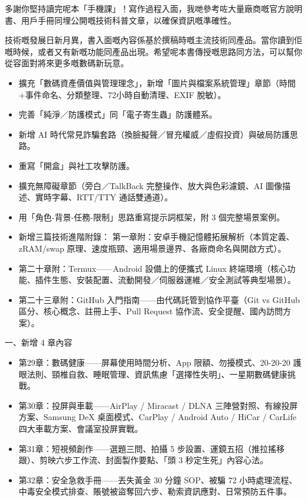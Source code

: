 
多謝你堅持讀完呢本「手機課」！寫作過程入面，我哋參考咗大量廠商嘅官方說明書、用戶手冊同埋公開嘅技術科普文章，以確保資訊嘅準確性。

技術嘅發展日新月異，書入面嘅內容係基於撰稿時嘅主流技術同產品。當你讀到佢嘅時候，或者又有新嘅功能同產品出現。希望呢本書傳授嘅思路同方法，可以幫你從容面對將來更多嘅數碼新玩意。


\begin{itemize}
  \item 擴充「數碼資產價值與管理理念」，新增「圖片與檔案系統管理」章節（時間+事件命名、分類整理、72小時自動清理、EXIF 脫敏）。
  \item 完善「純淨／防護模式」同「電子寄生蟲」防護體系。
  \item 新增 AI 時代常見詐騙套路（換臉擬聲／冒充權威／虛假投資）與破局防護思路。
  \item 重寫「開盒」與社工攻擊防護。
  \item 擴充無障礙章節（旁白／TalkBack 完整操作、放大與色彩濾鏡、AI 圖像描述、實時字幕、RTT/TTY 通話雙通道）。
  \item 用「角色-背景-任務-限制」思路重寫提示詞框架，附 3 個完整場景案例。
  \item 新增三篇技術進階附錄： 第一章附：安卓手機記憶體拓展解析（本質定義、zRAM/swap 原理、速度瓶頸、適用場景邊界、各廠商命名與開啟方式）。
  \item 第二十章附：Termux——Android 設備上的便攜式 Linux 終端環境（核心功能、插件生態、安裝配置、流動開發／伺服器運維／安全測試等典型場景）。
  \item 第二十三章附：GitHub 入門指南——由代碼託管到協作平臺（Git vs GitHub 區分、核心概念、註冊上手、Pull Request 協作流、安全提醒、國內訪問方案）。
\end{itemize}


一、新增 4 章內容

\begin{itemize}
  \item 第29章：數碼健康——屏幕使用時間分析、App 限額、勿擾模式、20-20-20 護眼法則、頸椎自救、睡眠管理、資訊焦慮「選擇性失明」、一星期數碼健康挑戰。
  \item 第30章：投屏與車載——AirPlay / Miracast / DLNA 三陣營對照、有線投屏方案、Samsung DeX 桌面模式、CarPlay / Android Auto / HiCar / CarLife 四大車載方案、會議室投屏實戰。
  \item 第31章：短視頻創作——選題三問、拍攝 5 步設置、運鏡五招（推拉搖移跟）、剪映六步工作流、封面製作要點、「頭 3 秒定生死」內容心法。
  \item 第32章：安全急救手冊——丟失黃金 30 分鐘 SOP、被騙 72 小時處理流程、中毒安全模式排查、賬號被盜奪回六步、勒索資訊應對、日常預防五件事。
\end{itemize}

